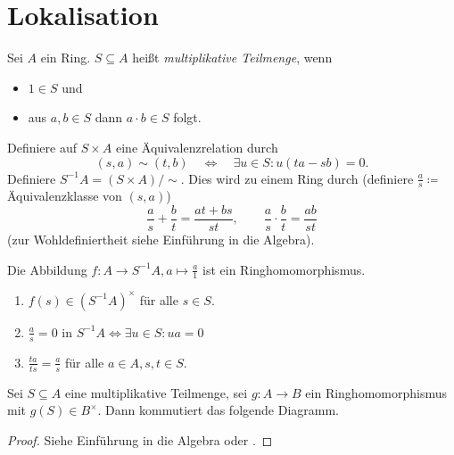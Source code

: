 \documentclass[12pt,a4paper]{scrartcl}
\theoremstyle{cplain}
\theoremstyle{cdef}
\begin{document}

\section{Lokalisation}
\begin{defi}
	Sei $A$ ein Ring. $S\subseteq A$ heißt \emph{multiplikative Teilmenge}, wenn
	\begin{itemize}
		\item $1\in S$ und
		\item aus $a,b\in S$ dann $a\cdot b \in S$ folgt.
	\end{itemize}
	Definiere auf $S\times A$ eine Äquivalenzrelation durch
	\[(s,a) \sim (t,b) \quad \Longleftrightarrow \quad \exists u\in S: u(ta-sb) = 0.\]
	Definiere $S^{-1}A = (S\times A)/\sim$. Dies wird zu einem Ring durch (definiere $\frac as \coloneqq$ Äquivalenzklasse von $(s,a)$)
	\[\frac as+\frac bt = \frac {at+bs}{st},\qquad \frac as\cdot \frac bt = \frac{ab}{st}\]
	(zur Wohldefiniertheit siehe Einführung in die Algebra).
	
	Die Abbildung $f\colon A\to S^{-1}A, a\mapsto \frac a1$ ist ein Ringhomomorphismus.
\end{defi}
\begin{bem}
	\leavevmode
	\begin{enumerate}
		\item $f(s)\in (S^{-1}A)^{\times}$ für alle $s\in S$.
		\item $\frac as = 0$ in $S^{-1}A\Leftrightarrow \exists u\in S: ua = 0$
		\item $\frac{ta}{ts} = \frac as$ für alle $a\in A, s,t\in S$.
	\end{enumerate}
\end{bem}
\begin{satz}
	Sei $S\subseteq A$ eine multiplikative Teilmenge, sei $g\colon A\to B$ ein Ringhomomorphismus mit $g(S) \in B^{\times}$. Dann kommutiert das folgende Diagramm.
	\begin{center}
	\end{center}
\end{satz}
\begin{proof}
	Siehe Einführung in die Algebra oder \cite[Proposition 3.1]{atiyah-macdonald}.
\end{proof}
\end{document}
